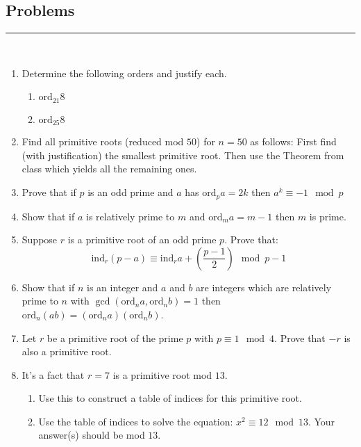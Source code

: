 \documentclass[class=article, crop=false]{standalone}
\def\ord{{\text{ord}}}
\def\ind{{\text{ind}}}
\begin{document}
\subsection{Problems}
\rule{\textwidth}{1pt}\\
\begin{enumerate}
\item
  Determine the following orders and justify each.
  \begin{enumerate}
  \item
	$\ord_{21}8$

  \item
	$\ord_{25}8$

  \end{enumerate}

\item
  Find all primitive roots (reduced mod $50$) for $n=50$ as follows:
  First find (with justification) the smallest primitive root.
  Then use the Theorem from class which yields all the remaining ones.

\item
  Prove that if $p$ is an odd prime and $a$ has $\ord_pa=2k$ then
  $a^k\equiv -1\mod p$

\item
  Show that if $a$ is relatively prime to $m$ and $\ord_ma=m-1$
  then $m$ is prime.

\item
  Suppose $r$ is a primitive root of an odd prime $p$.
  Prove that:
  $$\ind_r(p-a)\equiv \ind_ra+\left(\frac{p-1}{2}\right)\mod p-1$$

\item
  Show that if $n$ is an integer and $a$ and $b$ are integers which
  are relatively prime to $n$ with $\gcd(\ord_n a,\ord_n b)=1$
  then $\ord_n(ab)=(\ord_n a)(\ord_n b)$.

\item
  Let $r$ be a primitive root of the prime $p$ with $p\equiv 1\mod 4$.
  Prove that $-r$ is also a primitive root.

\item
  It's a fact that $r=7$ is a primitive root mod $13$.
  \begin{enumerate}
  \item
	Use this to construct a table of indices
	for this primitive root.

  \item
	Use the table of indices to solve the equation:
	$x^{2}\equiv 12\mod 13$.
	Your answer(s) should be mod $13$.


\end{enumerate}
\end{enumerate}
\end{document}
